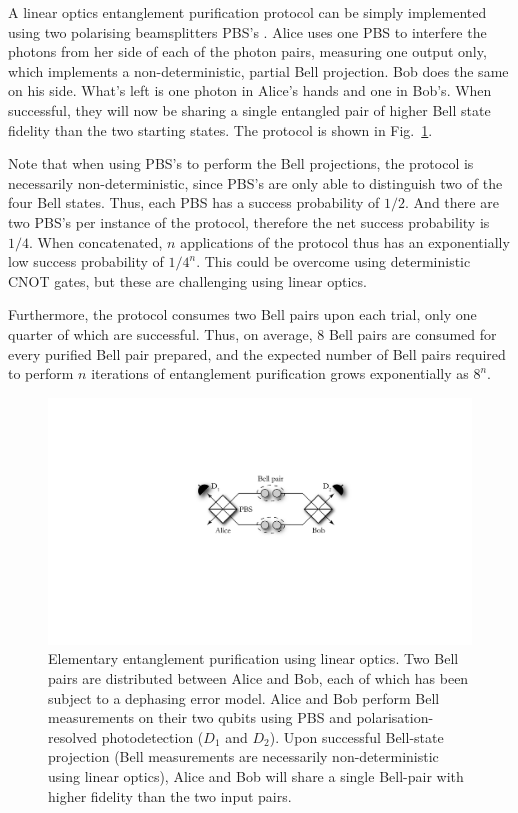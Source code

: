 \documentclass[aps,rmp,twocolumn,amsmath,amssymb,nofootinbib,superscriptaddress,longbibliography,floatfix]{revtex4-1}
\begin{document}
A linear optics entanglement purification protocol can be simply implemented using two polarising beamsplitters PBS's \cite{bib:Pan01, bib:Pan03}. Alice uses one PBS to interfere the photons from her side of each of the photon pairs, measuring one output only, which implements a non-deterministic, partial Bell projection. Bob does the same on his side. What's left is one photon in Alice's hands and one in Bob's. When successful, they will now be sharing a single entangled pair of higher Bell state fidelity than the two starting states. The protocol is shown in Fig.~\ref{fig:ent_purif_prot}.

Note that when using PBS's to perform the Bell projections, the protocol is necessarily non-deterministic, since PBS's are only able to distinguish two of the four Bell states. Thus, each PBS has a success probability of $1/2$. And there are two PBS's per instance of the protocol, therefore the net success probability is $1/4$. When concatenated, $n$ applications of the protocol thus has an exponentially low success probability of $1/4^n$. This could be overcome using deterministic CNOT gates, but these are challenging using linear optics.

Furthermore, the protocol consumes two Bell pairs upon each trial, only one quarter of which are successful. Thus, on average, 8 Bell pairs are consumed for every purified Bell pair prepared, and the expected number of Bell pairs required to perform $n$ iterations of entanglement purification grows exponentially as $8^n$.

\begin{figure}[!htb]
\includegraphics[width=0.9\columnwidth]{ent_purif_prot}
\caption{Elementary entanglement purification using linear optics. Two Bell pairs are distributed between Alice and Bob, each of which has been subject to a dephasing error model. Alice and Bob perform Bell measurements on their two qubits using PBS and polarisation-resolved photodetection ($D_1$ and $D_2$). Upon successful Bell-state projection (Bell measurements are necessarily non-deterministic using linear optics), Alice and Bob will share a single Bell-pair with higher fidelity than the two input pairs.} \label{fig:ent_purif_prot}
\end{figure}
\end{document}
